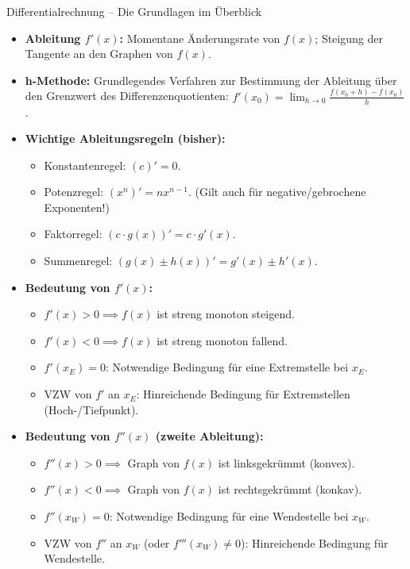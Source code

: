 \begin{kurzknappumgebung}{Differentialrechnung – Die Grundlagen im Überblick}
\begin{itemize}
    \item \textbf{Ableitung $f'(x)$:} Momentane Änderungsrate von $f(x)$; Steigung der Tangente an den Graphen von $f(x)$.
    \item \textbf{h-Methode:} Grundlegendes Verfahren zur Bestimmung der Ableitung über den Grenzwert des Differenzenquotienten: $f'(x_0) = \lim_{h \to 0} \frac{f(x_0+h) - f(x_0)}{h}$.
    \item \textbf{Wichtige Ableitungsregeln (bisher):}
        \begin{itemize}
            \item Konstantenregel: $(c)' = 0$.
            \item Potenzregel: $(x^n)' = nx^{n-1}$. (Gilt auch für negative/gebrochene Exponenten!)
            \item Faktorregel: $(c \cdot g(x))' = c \cdot g'(x)$.
            \item Summenregel: $(g(x) \pm h(x))' = g'(x) \pm h'(x)$.
        \end{itemize}
    \item \textbf{Bedeutung von $f'(x)$:}
        \begin{itemize}
            \item $f'(x) > 0 \implies f(x)$ ist streng monoton steigend.
            \item $f'(x) < 0 \implies f(x)$ ist streng monoton fallend.
            \item $f'(x_E) = 0$: Notwendige Bedingung für eine Extremstelle bei $x_E$.
            \item VZW von $f'$ an $x_E$: Hinreichende Bedingung für Extremstellen (Hoch-/Tiefpunkt).
        \end{itemize}
    \item \textbf{Bedeutung von $f''(x)$ (zweite Ableitung):}
        \begin{itemize}
            \item $f''(x) > 0 \implies$ Graph von $f(x)$ ist linksgekrümmt (konvex).
            \item $f''(x) < 0 \implies$ Graph von $f(x)$ ist rechtsgekrümmt (konkav).
            \item $f''(x_W) = 0$: Notwendige Bedingung für eine Wendestelle bei $x_W$.
            \item VZW von $f''$ an $x_W$ (oder $f'''(x_W) \neq 0$): Hinreichende Bedingung für Wendestelle.

\end{itemize}
\end{itemize}
\end{kurzknappumgebung}
